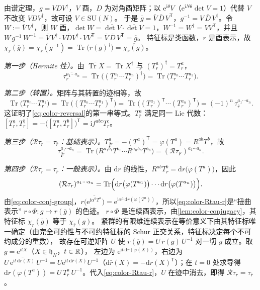 \documentclass[UTF8,a4paper,11pt,fontset=fandol]{ctexart}
\makeatletter
\let\amsmathbb\mathbb
\renewcommand{\mathbb}[1]{\ifx1#1\mathds{1}\else\amsmathbb{#1}\fi}
\theoremstyle{cplain}
\theoremstyle{cdefinition}
\theoremstyle{cremark}
\renewcommand{\proofname}{证明}
\renewenvironment{proof}[1][\proofname]{\par\pushQED{\qed}\normalfont\topsep6\p@\@plus6\p@\relax
  \trivlist\item[\hskip\labelsep\itshape #1\hspace{0.5em}]\ignorespaces}{\popQED\endtrivlist\@endpefalse}
\numberwithin{equation}{section}
\DeclareMathOperator{\Tr}{Tr}
\newcommand{\dd}{\mathrm{d}}                         %
\newcommand{\tp}{\mathsf{T}}                         %
\newcommand{\Rop}{\mathcal{R}}                       %
\newcommand{\ii}{\mathrm{i}}                        %
\newcommand{\ee}{\mathrm{e}}                        %
\makeatother
\begin{document}
\begin{proof}
由谱定理，$g=VDV^\dagger$，$V$ 酉，$D$ 为对角酉矩阵；以 $\ee^{\ii\theta}V$（$\ee^{\ii N\theta}\det V=1$）代替 $V$ 不改变 $VDV^\dagger$，故可设 $V\in\mathrm{SU}(N)$。
于是 $\overline g=\overline V\,\overline D\,V^{\tp}$，$g^{-1}=V\,\overline D\,V^\dagger$。令 $W:=\overline V\,V^\dagger$，则 $W$ 酉，$\det W=\overline{\det V}\cdot\overline{\det V}=1$，$W^{-1}=W^\dagger=VV^{\tp}$，并且
$W\,g^{-1}\,W^{-1}=\overline V\,V^\dagger\cdot V\overline DV^\dagger\cdot VV^{\tp}=\overline V\,\overline D\,V^{\tp}=\overline g$。
特征标是类函数，$r$ 是酉表示，故 $\chi_r(\overline g)=\chi_r(g^{-1})=\Tr\bigl(r(g)^\dagger\bigr)=\overline{\chi_r(g)}$。
\end{proof}

\begin{proof}[\cref{lem:color-reversal}的证明]
\emph{第一步（Hermite 性）。}由 $\overline{\Tr X}=\Tr X^\dagger$ 与 $(T_r^a)^\dagger=T_r^a$，
\[
\overline{\tau_r^{a_1\cdots a_n}}=\Tr\bigl((T_r^{a_1}\cdots T_r^{a_n})^\dagger\bigr)=\Tr\bigl(T_r^{a_n}\cdots T_r^{a_1}\bigr).
\]

\emph{第二步（转置）。}矩阵与其转置的迹相等，故
\[
\Tr\bigl(T_r^{a_n}\cdots T_r^{a_1}\bigr)=\Tr\bigl((T_r^{a_n}\cdots T_r^{a_1})^{\tp}\bigr)=\Tr\bigl((T_r^{a_1})^{\tp}\cdots(T_r^{a_n})^{\tp}\bigr)=(-1)^n\,\tau_{\bar r}^{a_1\cdots a_n}.
\]
这证明了\cref{eq:color-reversal}的第一串等式。$T_{\bar r}^a$ 满足同一 Lie 代数：$[T_{\bar r}^a,T_{\bar r}^b]=-\bigl([T_r^a,T_r^b]\bigr)^{\tp}=\ii f^{abc}T_{\bar r}^c$。

\emph{第三步（$\Rop\tau_r=\tau_{\bar r}$：基础表示）。}$T_{\bar F}^a=-(T^a)^{\tp}=\varphi(T^a)=R^{ab}T^b$，故
\[
\tau_{\bar F}^{a_1\cdots a_n}=\Tr\bigl(R^{a_1b_1}T^{b_1}\cdots R^{a_nb_n}T^{b_n}\bigr)=(\Rop\tau_F)^{a_1\cdots a_n}.
\]

\emph{第四步（$\Rop\tau_r=\tau_{\bar r}$：一般表示）。}由 $\dd r$ 的线性，$R^{ab}T_r^b=\dd r\bigl(\varphi(T^a)\bigr)$，因此
\begin{equation}\label{eq:color-Rtau-r}
(\Rop\tau_r)^{a_1\cdots a_n}=\Tr\Bigl(\dd r\bigl(\varphi(T^{a_1})\bigr)\cdots\dd r\bigl(\varphi(T^{a_n})\bigr)\Bigr).
\end{equation}
由\cref{eq:color-conj-group}，$r\bigl(\overline{\ee^{\ii\alpha^aT^a}}\bigr)=\ee^{\ii\alpha^a\,\dd r(\varphi(T^a))}$，所以\cref{eq:color-Rtau-r}是“扭曲表示” $r\circ\Phi:g\mapsto r(\overline g)$ 的色迹。
$r\circ\Phi$ 是连续酉表示，由\cref{lem:color-conjugacy}，其特征标 $\chi_r(\overline g)$ 等于 $\chi_{\bar r}(g)$。
紧群的有限维连续表示在等价意义下由其特征标唯一确定（由完全可约性与不可约特征标的 Schur 正交关系，特征标决定每个不可约成分的重数），
故存在可逆矩阵 $U$ 使 $r(\overline g)=U\,\bar r(g)\,U^{-1}$ 对一切 $g$ 成立。取 $g=\ee^{\ii tX}$（$X\in\mathfrak h_N$，$t\in\mathbb R$），
左边为 $\ee^{\ii t\,\dd r(\varphi(X))}$，右边为 $U\,\overline{\ee^{\ii t\,\dd r(X)}}\,U^{-1}=U\ee^{\ii t\,\dd\bar r(X)}U^{-1}$（$\dd\bar r(X)=-\dd r(X)^{\tp}$）；在 $t=0$ 处求导得
$\dd r(\varphi(T^a))=U\,T_{\bar r}^a\,U^{-1}$。代入\cref{eq:color-Rtau-r}，$U$ 在迹中消去，即得 $\Rop\tau_r=\tau_{\bar r}$。


\end{proof}
\end{document}

